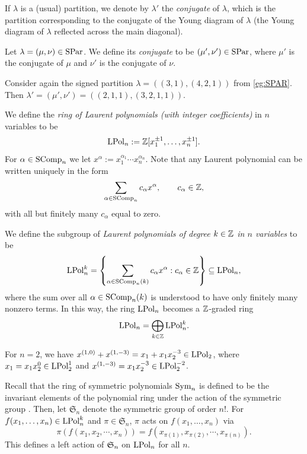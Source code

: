 \documentclass[11pt]{amsart}
\begin{document}
If $\lambda$ is a (usual) partition, we denote by $\lambda'$ the \emph{conjugate} of $\lambda$, which is the partition corresponding to the conjugate of the Young diagram of $\lambda$ (the Young diagram of $\lambda$ reflected across the main diagonal). 
\begin{defin}
    Let $\lambda = (\mu, \nu) \in \mathrm{SPar}$. We define its \emph{conjugate} to be $(\mu', \nu')\in \mathrm{SPar}$, where $\mu'$ is the conjugate of $\mu$ and $\nu'$ is the conjugate of $\nu$. 
\end{defin}

\begin{eg}
    Consider again the signed partition $\lambda = ((3,1),(4,2,1))$ from \cref{eg:SPAR}. Then $\lambda' = (\mu', \nu') = ((2,1,1),(3,2,1,1))$.
\end{eg}

\begin{defin} \label{def:LPol}
We define the \emph{ring of Laurent polynomials (with integer coefficients)} in \(n \) variables to be
\[
\mathrm{LPol}_n := \mathbb{Z} [x_1^{\pm 1},\dots,x_n^{\pm 1}].
\]
For \(\alpha \in \mathrm{SComp}_n\) we let \(x^\alpha := x_1^{\alpha_1}\cdots x_n^{\alpha_n}\). Note that any Laurent polynomial can be written uniquely in the form 
\begin{align}
    \sum_{\alpha \in \mathrm{SComp}_n} c_\alpha x^\alpha, \qquad c_\alpha \in \mathbb{Z},
\end{align}
with all but finitely many \(c_\alpha\) equal to zero.

We define the subgroup of \emph{Laurent polynomials of degree \(k \in \mathbb{Z}\) in \(n\) variables} to be
\[
\mathrm{LPol}_n^k = \left\{ \sum_{\alpha \in \mathrm{SComp}_n(k)} c_\alpha x^\alpha : c_\alpha \in \mathbb{Z} \right\}
\subseteq \mathrm{LPol}_n,
\]
where the sum over all \(\alpha \in \mathrm{SComp}_n (k)\) is understood to have only finitely many nonzero terms.  In this way, the ring \(\mathrm{LPol}_n\) becomes a \(\mathbb{Z}\)-graded ring 
\[
\mathrm{LPol}_n = \bigoplus_{k \in \mathbb{Z}} \mathrm{LPol}_n^k.
\]
\end{defin}

\begin{eg}
    For $n=2$, we have $x^{(1,0)} + x^{(1,-3)} =x_1+x_1x_2^{-3} \in \mathrm{LPol}_2$, where $x_1=x_1x_2^0 \in \mathrm{LPol}_2^1$ and $x^{(1,-3)} =x_1x_2^{-3} \in \mathrm{LPol}_2^{-2}$.
\end{eg}

Recall that the ring of symmetric polynomials $\mathrm{Sym}_n$ is defined to be the invariant elements of the polynomial ring under the action of the symmetric group \cite[Ch.I, \S2]{Mac15}. Then, let $\mathfrak{S}_n$ denote the symmetric group of order $n!$. 
For $f(x_1, \dots, x_n) \in \mathrm{LPol}_n^k$ and $\pi \in \mathfrak{S}_n$, $\pi$ acts on $f(x_1, \dots, x_n)$ via
\[\pi (f(x_1, x_2, \cdots, x_n) )=f(x_{\pi(1)}, x_{\pi(2)}, \cdots, x_{\pi(n)}).\] 
This defines a left action of $\mathfrak{S}_n$ on $\mathrm{LPol}_n$ for all $n$.
\end{document}
